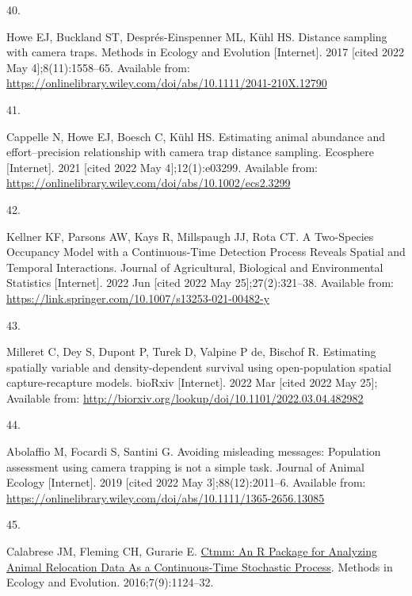 \documentclass[10pt,a4paper]{article}
\newlength{\cslhangindent}
\newlength{\csllabelwidth}
\newenvironment{CSLReferences}[2] %
{\begin{list}{}{%
	\setlength{\itemindent}{0pt}
	\setlength{\leftmargin}{0pt}
	\setlength{\parsep}{0pt}
	\ifodd #1
	\setlength{\leftmargin}{\cslhangindent}
	\setlength{\itemindent}{-1\cslhangindent}
	\fi
	\setlength{\itemsep}{#2\baselineskip}}}
{\end{list}}
\newcommand{\CSLLeftMargin}[1]{\parbox[t]{\csllabelwidth}{\strut#1\strut}}
\newcommand{\CSLRightInline}[1]{\parbox[t]{\linewidth - \csllabelwidth}{\strut#1\strut}}
\begin{document}
\begin{CSLReferences}{0}{1}
\CSLLeftMargin{40. }%
\CSLRightInline{Howe EJ, Buckland ST, Després-Einspenner ML, Kühl HS. Distance sampling with camera traps. Methods in Ecology and Evolution {[}Internet{]}. 2017 {[}cited 2022 May 4{]};8(11):1558--65. Available from: \url{https://onlinelibrary.wiley.com/doi/abs/10.1111/2041-210X.12790}}

\CSLLeftMargin{41. }%
\CSLRightInline{Cappelle N, Howe EJ, Boesch C, Kühl HS. Estimating animal abundance and effort--precision relationship with camera trap distance sampling. Ecosphere {[}Internet{]}. 2021 {[}cited 2022 May 4{]};12(1):e03299. Available from: \url{https://onlinelibrary.wiley.com/doi/abs/10.1002/ecs2.3299}}

\CSLLeftMargin{42. }%
\CSLRightInline{Kellner KF, Parsons AW, Kays R, Millspaugh JJ, Rota CT. A {Two}-{Species} {Occupancy} {Model} with a {Continuous}-{Time} {Detection} {Process} {Reveals} {Spatial} and {Temporal} {Interactions}. Journal of Agricultural, Biological and Environmental Statistics {[}Internet{]}. 2022 Jun {[}cited 2022 May 25{]};27(2):321--38. Available from: \url{https://link.springer.com/10.1007/s13253-021-00482-y}}

\CSLLeftMargin{43. }%
\CSLRightInline{Milleret C, Dey S, Dupont P, Turek D, Valpine P de, Bischof R. Estimating spatially variable and density-dependent survival using open-population spatial capture-recapture models. bioRxiv {[}Internet{]}. 2022 Mar {[}cited 2022 May 25{]}; Available from: \url{http://biorxiv.org/lookup/doi/10.1101/2022.03.04.482982}}

\CSLLeftMargin{44. }%
\CSLRightInline{Abolaffio M, Focardi S, Santini G. Avoiding misleading messages: {Population} assessment using camera trapping is not a simple task. Journal of Animal Ecology {[}Internet{]}. 2019 {[}cited 2022 May 3{]};88(12):2011--6. Available from: \url{https://onlinelibrary.wiley.com/doi/abs/10.1111/1365-2656.13085}}

\CSLLeftMargin{45. }%
\CSLRightInline{Calabrese JM, Fleming CH, Gurarie E. \href{https://doi.org/10.1111/2041-210X.12559}{Ctmm: An {R} {Package} for {Analyzing} {Animal} {Relocation} {Data} {As} a {Continuous}-{Time} {Stochastic} {Process}}. Methods in Ecology and Evolution. 2016;7(9):1124--32. }


\end{CSLReferences}
\end{document}
